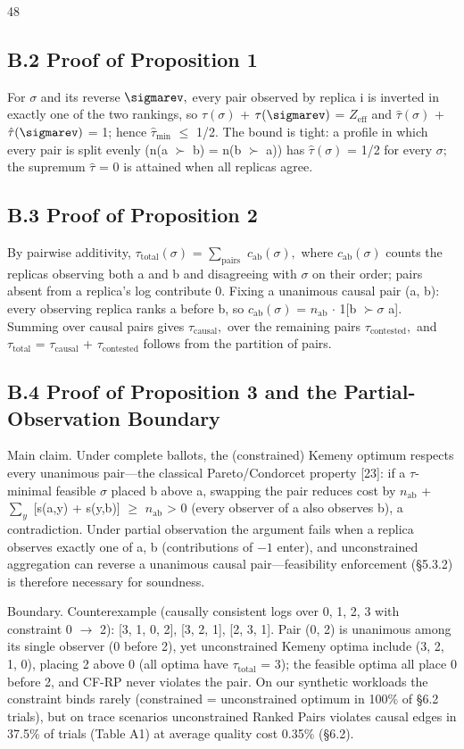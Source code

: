 \documentclass[10pt,twocolumn]{article}
\begin{document}
\begin{thebibliography}{48}
\subsection{B.2 Proof of Proposition 1}
For $\sigma$ and its reverse $\sigmarev,$ every pair observed by replica i is inverted in exactly one of the two rankings, so $\tau(\sigma)$ + $\tau(\sigmarev)$ = $Z_{\mathrm{eff}}$ and $\hat{\tau}(\sigma)$ + $\hat{\tau}(\sigmarev)$ = 1; hence $\hat{\tau}_{\mathrm{min}}$ $\leq$ 1/2. The bound is tight: a profile in which every pair is split evenly (n(a $\succ$ b) = n(b $\succ$ a)) has $\hat{\tau}(\sigma)$ = 1/2 for every $\sigma;$ the supremum $\hat{\tau}$ = 0 is attained when all replicas agree.

\subsection{B.3 Proof of Proposition 2}
By pairwise additivity, $\tau_{\mathrm{total}}(\sigma)$ = $\sum_{\mathrm{pairs}}$ $c_{\mathrm{ab}}(\sigma),$ where $c_{\mathrm{ab}}(\sigma)$ counts the replicas observing both a and b and disagreeing with $\sigma$ on their order; pairs absent from a replica's log contribute 0. Fixing a unanimous causal pair (a, b): every observing replica ranks a before b, so $c_{\mathrm{ab}}(\sigma)$ = $n_{\mathrm{ab}}$ $\cdot$ 1[b $\succ\sigma$ a]. Summing over causal pairs gives $\tau_{\mathrm{causal}},$ over the remaining pairs $\tau_{\mathrm{contested}},$ and $\tau_{\mathrm{total}}$ = $\tau_{\mathrm{causal}}$ + $\tau_{\mathrm{contested}}$ follows from the partition of pairs.

\subsection{B.4 Proof of Proposition 3 and the Partial-Observation Boundary}
Main claim. Under complete ballots, the (constrained) Kemeny optimum respects every unanimous pair—the classical Pareto/Condorcet property [23]: if a $\tau$-minimal feasible $\sigma$ placed b above a, swapping the pair reduces cost by $n_{\mathrm{ab}}$ + $\sum_{y}$ [s(a,y) + s(y,b)] $\geq$ $n_{\mathrm{ab}}$ > 0 (every observer of a also observes b), a contradiction. Under partial observation the argument fails when a replica observes exactly one of a, b (contributions of $-1$ enter), and unconstrained aggregation can reverse a unanimous causal pair—feasibility enforcement (§5.3.2) is therefore necessary for soundness.

Boundary. Counterexample (causally consistent logs over {0, 1, 2, 3} with constraint 0 $\rightarrow$ 2): [3, 1, 0, 2], [3, 2, 1], [2, 3, 1]. Pair (0, 2) is unanimous among its single observer (0 before 2), yet unconstrained Kemeny optima include (3, 2, 1, 0), placing 2 above 0 (all optima have $\tau_{\mathrm{total}}$ = 3); the feasible optima all place 0 before 2, and CF-RP never violates the pair. On our synthetic workloads the constraint binds rarely (constrained = unconstrained optimum in 100\% of §6.2 trials), but on trace scenarios unconstrained Ranked Pairs violates causal edges in 37.5\% of trials (Table A1) at average quality cost 0.35\% (§6.2).


\end{thebibliography}
\end{document}
